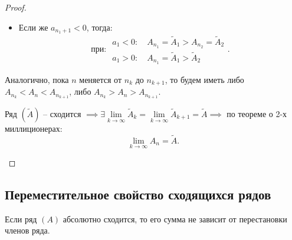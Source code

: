 \begin{proof}
\begin{enumerate}
\begin{itemize}
                  \item Если же $a_{n_1 + 1} < 0$, тогда:
                        \[
                            \text{при: }\begin{array}{l}
                                a_1 < 0: \quad A_{n_1} = \widetilde{A}_1 > A_{n_2} = \widetilde{A}_2 \\
                                a_1 > 0: \quad A_{n_1} = \widetilde{A}_1 > \widetilde{A}_2
                            \end{array}.
                        \]
              \end{itemize}

              Аналогично, пока $n$ меняется от $n_k$ до $n_{k+1}$, то будем иметь либо $A_{n_k} < A_n < A_{n_{k+1}}$, либо $A_{n_k} > A_n > A_{n_{k+1}}$.

              Ряд $(\widetilde{A})$ -- сходится $\implies \exists \underset{k\rightarrow\infty}{\lim}\widetilde{A}_k = \underset{k\rightarrow\infty}{\lim}\widetilde{A}_{k+1} = \widetilde{A} \implies$ по теореме о 2-х миллиционерах:
              \[
                  \underset{k\rightarrow\infty}{\lim}A_n = \widetilde{A}.
              \]
    \end{enumerate}
\end{proof}

\subsection{Переместительное свойство сходящихся рядов}

\begin{theorem}
    Если ряд $(A)$ абсолютно сходится, то его сумма не зависит от перестановки членов ряда.
\end{theorem}

